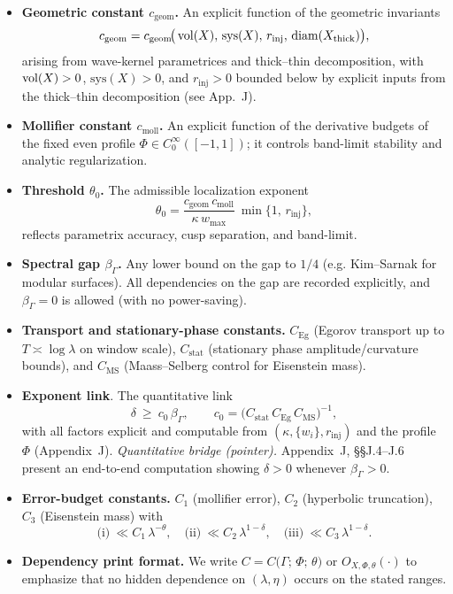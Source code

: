 \begin{itemize}
  \item \textbf{Geometric constant $c_{\mathrm{geom}}$.} An explicit function of the geometric invariants
        \[
           c_{\mathrm{geom}}=c_{\mathrm{geom}}\!\big(\operatorname{vol}(X),\,\mathrm{sys}(X),\,r_{\mathrm{inj}},\,\mathrm{diam}(X_{\mathrm{thick}})\big),
        \]
        arising from wave-kernel parametrices and thick--thin decomposition, with $\operatorname{vol}(X)>0$, $\mathrm{sys}(X)>0$, and $r_{\mathrm{inj}}>0$ bounded below by explicit inputs from the thick--thin decomposition (see App.~J).
  \item \textbf{Mollifier constant $c_{\mathrm{moll}}$.} An explicit function of the derivative budgets of the fixed even profile $\Phi\in C_0^\infty([-1,1])$; it controls band-limit stability and analytic regularization.
  \item \textbf{Threshold $\theta_0$.} The admissible localization exponent
        \[
          \theta_0=\frac{c_{\mathrm{geom}}\,c_{\mathrm{moll}}}{\kappa\,w_{\max}}\ \min\{1,\,r_{\mathrm{inj}}\},
        \]
        reflects parametrix accuracy, cusp separation, and band-limit.
  \item \textbf{Spectral gap $\beta_\Gamma$.} Any lower bound on the gap to $1/4$ (e.g. Kim--Sarnak for modular surfaces).
        All dependencies on the gap are recorded explicitly, and $\beta_\Gamma=0$ is allowed (with no power-saving).
  \item \textbf{Transport and stationary-phase constants.}
        $C_{\mathrm{Eg}}$ (Egorov transport up to $T\asymp\log\lambda$ on window scale),
        $C_{\mathrm{stat}}$ (stationary phase amplitude/curvature bounds),
        and $C_{\mathrm{MS}}$ (Maass--Selberg control for Eisenstein mass).
  \item \textbf{Exponent link}. The quantitative link
        \[
           \delta\ \ge\ c_0\,\beta_\Gamma,\qquad
           c_0=\big(C_{\mathrm{stat}}\,C_{\mathrm{Eg}}\,C_{\mathrm{MS}}\big)^{-1},
        \]
        with all factors explicit and computable from $(\kappa,\{w_i\},r_{\mathrm{inj}})$ and the profile $\Phi$ (Appendix~J).
        \emph{Quantitative bridge (pointer).} Appendix~J, \S\S J.4--J.6 present an end-to-end computation showing $\delta>0$ whenever $\beta_\Gamma>0$.
  \item \textbf{Error-budget constants.} $C_1$ (mollifier error), $C_2$ (hyperbolic truncation), $C_3$ (Eisenstein mass) with
        \[
        \text{(i)}\ \ll C_1\,\lambda^{-\theta},\quad
        \text{(ii)}\ \ll C_2\,\lambda^{1-\delta},\quad
        \text{(iii)}\ \ll C_3\,\lambda^{1-\delta}.
        \]
  \item \textbf{Dependency print format.}
        We write $C=C\big(\Gamma;\,\Phi;\,\theta\big)$ or $O_{X,\Phi,\theta}(\cdot)$ to emphasize that no hidden dependence on $(\lambda,\eta)$ occurs on the stated ranges.
\end{itemize}


